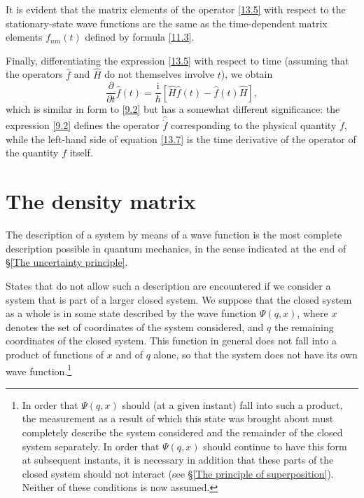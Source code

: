 It is evident that the matrix elements of the operator \eqref{13.5} with respect to the stationary-state wave functions are the same as the time-dependent matrix elements $ f_{nm}(t) $ defined by formula \eqref{11.3}.

Finally, differentiating the expression \eqref{13.5} with respect to time (assuming that the operators $ \hat{f} $ and $ \hat{H} $ do not themselves involve $ t $), we obtain
\begin{equation}\label{13.7}
\frac{\partial}{\partial t}\hat{f}(t)=\frac{\mathrm{i}}{\hbar}\left[\hat{H}\hat{f}(t)-\hat{f}(t)\hat{H} \right],
\end{equation}
which is similar in form to \eqref{9.2} but has a somewhat different significance: the expression \eqref{9.2} defines the operator $ \hat{\dot{f}} $ corresponding to the physical quantity $ \dot{f} $, while the left-hand side of equation \eqref{13.7} is the time derivative of the operator of the quantity $ f $ itself.
\section{The density matrix}\label{The density matrix}
The description of a system by means of a wave function is the most complete description possible in quantum mechanics, in the sense indicated at the end of \S\ref{The uncertainty principle}.

States that do not allow such a description are encountered if we consider a system that is part of a larger closed system. We suppose that the closed system as a whole is in some state described by the wave function $ \Psi(q, x) $, where $ x $ denotes the set of coordinates of the system considered, and $ q $ the remaining coordinates of the closed system. This function in general does not fall into a product of functions of $ x $ and of $ q $ alone, so that the system does not have its own wave function.\footnote{In order that $ \Psi(q, x) $ should (at a given instant) fall into such a product, the measurement as a result of which this state was brought about must completely describe the system considered and the remainder of the closed system separately. In order that $ \Psi(q, x) $ should continue to have this form at subsequent instants, it is necessary in addition that these parts of the closed system should not interact (see §\ref{The principle of superposition}). Neither of these conditions is now assumed.
}

